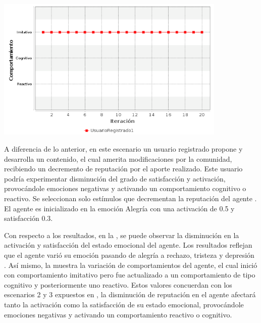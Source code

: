 \begin{ilustracion}[fuente=\yo, etiqueta=emociones-individuales-escenario1-modificacion-de-comportamiento, titulo={Variación del Comportamiento Exhibido por el Agente, Caso de Estudio 2 Escenario 1}]
\includegraphics[width=11cm]{ilustraciones/resultados/caso2escenerio1-modificacion-de-comportamiento.png}
\end{ilustracion}

\clearpage
\newpage


A diferencia de lo anterior, en este escenario un usuario registrado propone y desarrolla un contenido,
el cual amerita modificaciones por la comunidad, recibiendo
un decremento de reputación por el aporte realizado. Este usuario
podría experimentar disminución del grado de satisfacción y activación,
provocándole emociones negativas y activando un comportamiento
cognitivo o reactivo.
Se seleccionan
solo estímulos que decrementan la reputación del agente .
El agente es inicializado en la emoción Alegría con una activación de 0.5
y satisfacción 0.3.

Con respecto a los resultados, en la , se puede observar
la disminución en la activación y satisfacción del estado emocional del agente.
Los resultados reflejan que el agente varió su emoción pasando de alegría a rechazo, tristeza y depresión .
Así mismo, la 
muestra la variación de comportamientos del agente, el cual inició con comportamiento imitativo
pero fue actualizado a un comportamiento de tipo cognitivo y posteriormente uno reactivo.
Estos valores concuerdan con los escenarios 2 y 3 expuestos
en \cite{perozo2012}, la disminución de reputación en el agente afectará tanto la activación
como la satisfacción de su estado emocional,
provocándole emociones negativas y activando un comportamiento
reactivo o cognitivo.


